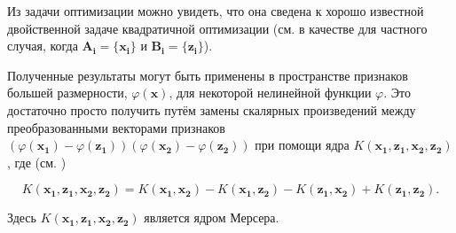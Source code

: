 \documentclass[12pt,a4paper,oneside]{article}
\begin{document}
\par
Из задачи оптимизации можно увидеть, что она сведена к хорошо известной двойственной задаче квадратичной оптимизации (см. в качестве  для частного случая, когда \(\mathbf{A_i} = \{\mathbf{x_i}\}\) и \(\mathbf{B_i} = \{\mathbf{z_i}\}\)). 

\par
Полученные результаты могут быть применены в пространстве признаков большей размерности, \(\varphi(\mathbf{x})\), для некоторой нелинейной функции \(\varphi\). 
Это достаточно просто получить путём замены скалярных произведений между преобразованными векторами признаков \((\varphi(\mathbf{x_1}) - \varphi(\mathbf{z_1})) (\varphi(\mathbf{x_2}) - \varphi(\mathbf{z_2}))\) при помощи ядра \(K(\mathbf{x_1}, \mathbf{z_1}, \mathbf{x_2}, \mathbf{z_2})\), где (см. )

\[
K(\mathbf{x_1}, \mathbf{z_1}, \mathbf{x_2}, \mathbf{z_2}) = K(\mathbf{x_1}, \mathbf{x_2}) - K(\mathbf{x_1}, \mathbf{z_2}) - K(\mathbf{z_1}, \mathbf{x_2}) + K(\mathbf{z_1}, \mathbf{z_2}).
\]

\par
Здесь \(K(\mathbf{x_1}, \mathbf{z_1}, \mathbf{x_2}, \mathbf{z_2})\) является ядром Мерсера. 

\end{document}
